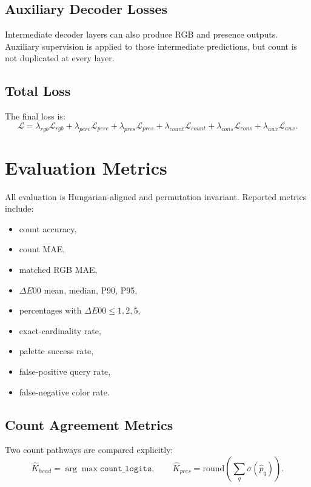 \documentclass[11pt,a4paper]{article}
\begin{document}
\subsection{Auxiliary Decoder Losses}

Intermediate decoder layers can also produce RGB and presence outputs. Auxiliary supervision is applied to those intermediate predictions, but count is not duplicated at every layer.

\subsection{Total Loss}

The final loss is:
\begin{equation}
\mathcal{L}
=
\lambda_{rgb}\mathcal{L}_{rgb}
+
\lambda_{perc}\mathcal{L}_{perc}
+
\lambda_{pres}\mathcal{L}_{pres}
+
\lambda_{count}\mathcal{L}_{count}
+
\lambda_{cons}\mathcal{L}_{cons}
+
\lambda_{aux}\mathcal{L}_{aux}.
\end{equation}

\section{Evaluation Metrics}

All evaluation is Hungarian-aligned and permutation invariant. Reported metrics include:
\begin{itemize}[leftmargin=2em]
    \item count accuracy,
    \item count MAE,
    \item matched RGB MAE,
    \item $\Delta E00$ mean, median, P90, P95,
    \item percentages with $\Delta E00 \le 1,2,5$,
    \item exact-cardinality rate,
    \item palette success rate,
    \item false-positive query rate,
    \item false-negative color rate.
\end{itemize}

\subsection{Count Agreement Metrics}

Two count pathways are compared explicitly:
\begin{equation}
\hat{K}_{head} = \arg\max \texttt{count\_logits},
\qquad
\hat{K}_{pres} = \text{round}\left(\sum_q \sigma(\hat{p}_q)\right).
\end{equation}
\end{document}
